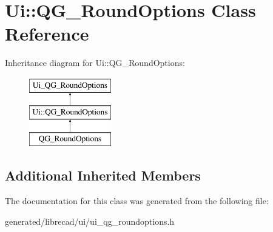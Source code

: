 \hypertarget{classUi_1_1QG__RoundOptions}{\section{Ui\-:\-:Q\-G\-\_\-\-Round\-Options Class Reference}
\label{classUi_1_1QG__RoundOptions}
}
Inheritance diagram for Ui\-:\-:Q\-G\-\_\-\-Round\-Options\-:\begin{figure}[H]
\begin{center}
\leavevmode
\includegraphics[height=3.000000cm]{classUi_1_1QG__RoundOptions}
\end{center}
\end{figure}
\subsection*{Additional Inherited Members}


The documentation for this class was generated from the following file\-:\begin{DoxyCompactItemize}
\item 
generated/librecad/ui/ui\-\_\-qg\-\_\-roundoptions.\-h\end{DoxyCompactItemize}
